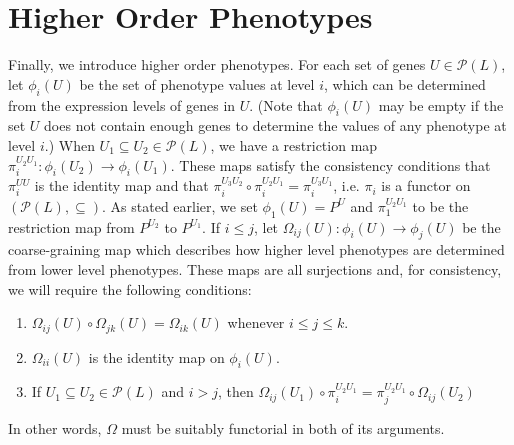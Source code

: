 \section{Higher Order Phenotypes}

Finally, we introduce higher order phenotypes.  For each set of genes $U \in \mathcal{P}(L)$, let $\phi_i (U)$ be the set of phenotype values at level $i$, which can be determined from the expression levels of genes in $U$.  (Note that $\phi_i (U)$ may be empty if the set $U$ does not contain enough genes to determine the values of any phenotype at level $i$.)  When $U_1 \subseteq U_2 \in \mathcal{P}(L)$, we have a restriction map $\pi_i^{U_2 U_1} \colon \phi_i(U_2) \to \phi_i(U_1)$.  These maps satisfy the consistency conditions that $\pi_i^{UU}$ is the identity map and that $\pi_i^{U_3 U_2} \circ \pi_i^{U_2 U_1} = \pi_i^{U_3 U_1}$, i.e. $\pi_i$ is a functor on $(\mathcal{P}(L), \subseteq)$.  As stated earlier, we set $\phi_1 (U) = P^U$ and $\pi_1^{U_2 U_1}$ to be the restriction map from $P^{U_2}$ to $P^{U_1}$.  If $i \le j$, let $\Omega_{ij}(U) : \phi_i(U) \to \phi_j(U)$ be the coarse-graining map which describes how higher level phenotypes are determined from lower level phenotypes.  These maps are all surjections and, for consistency, we will require the following conditions:
\begin{enumerate}
\item $\Omega_{ij}(U) \circ \Omega_{jk}(U) = \Omega_{ik}(U)$ whenever $i \le j \le k$.
\item $\Omega_{ii}(U)$ is the identity map on $\phi_i (U)$.
\item If $U_1 \subseteq U_2 \in \mathcal{P}(L)$ and $i > j$, then $\Omega_{ij}(U_1) \circ \pi_i^{U_2 U_1} = \pi_j^{U_2 U_1} \circ \Omega_{ij}(U_2)$
\end{enumerate}
In other words, $\Omega$ must be suitably functorial in both of its arguments.

